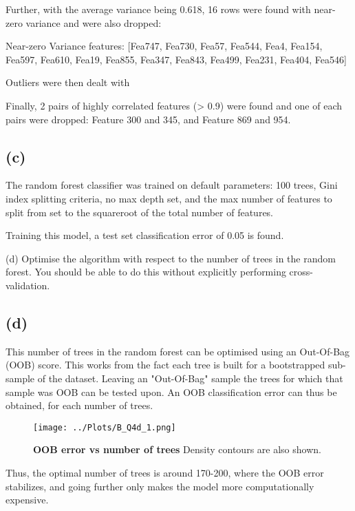 \documentclass[12pt]{report} %
\begin{document}
Further, with the average variance being 0.618, 16 rows were found with near-zero variance and were also dropped:

\begin{center}
    Near-zero Variance features: [Fea747, Fea730, Fea57, Fea544, Fea4, Fea154, Fea597, Fea610, Fea19, Fea855, Fea347, Fea843, Fea499, Fea231, Fea404, Fea546]
\end{center}

Outliers were then dealt with

Finally, 2 pairs of highly correlated features (> 0.9) were found and one of each pairs were dropped: Feature 300 and 345, and Feature 869 and 954.


\subsection*{(c)}

The random forest classifier was trained on default parameters: 100 trees, Gini index splitting criteria, no max depth set, and the max number of features to split from set to the squareroot of the total number of features.  

Training this model, a test set classification error of 0.05 is found.

(d) Optimise the algorithm with respect to the number of trees in the random forest. You should be able to do this without explicitly performing cross-validation.

\subsection*{(d)}

This number of trees in the random forest can be optimised using an Out-Of-Bag (OOB) score. This works from the fact each tree is built for a bootstrapped sub-sample of the dataset. Leaving an "Out-Of-Bag" sample the trees for which that sample was OOB can be tested upon. An OOB classification error can thus be obtained, for each number of trees\cite[p. 345]{james2013introduction}.  


\begin{figure}[htbp]
    \centering
    \texttt{[image: ../Plots/B\_Q4d\_1.png]}
    \caption{\textbf{OOB error vs number of trees} Density contours are also shown.}
\end{figure}

Thus, the optimal number of trees is around 170-200, where the OOB error stabilizes, and going further only makes the model more computationally expensive.
\end{document}
